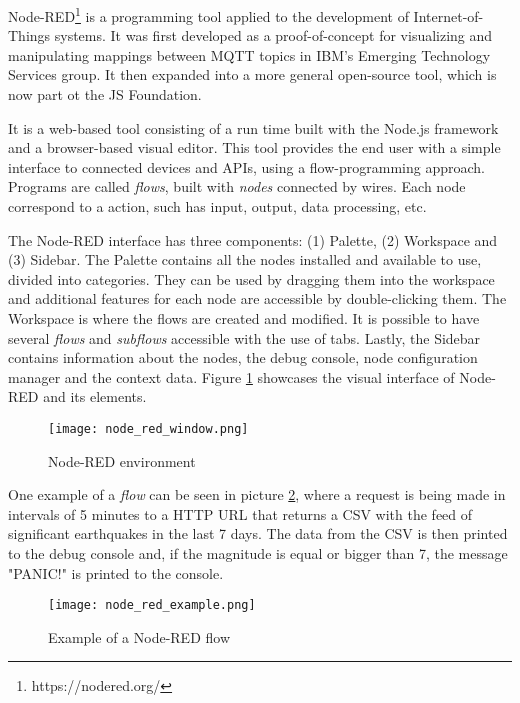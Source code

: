 Node-RED\footnote{https://nodered.org/} is a programming tool applied to the development of Internet-of-Things systems. It was first developed as a proof-of-concept for visualizing and manipulating mappings between MQTT topics in IBM's Emerging Technology Services group. It then expanded into a more general open-source tool, which is now part ot the JS Foundation.
\par It is a web-based tool consisting of a run time built with the Node.js framework and a browser-based visual editor. This tool provides the end user with a simple interface to connected devices and APIs, using a flow-programming approach. Programs are called \emph{flows}, built with \emph{nodes} connected by wires. Each node correspond to a action, such has input, output, data processing, etc. 
\par The Node-RED interface has three components: (1) Palette, (2) Workspace and (3) Sidebar. The Palette contains all the nodes installed and available to use, divided into categories. They can be used by dragging them into the workspace and additional features for each node are accessible by double-clicking them. The Workspace is where the flows are created and modified. It is possible to have several \emph{flows} and \emph{subflows} accessible with the use of tabs. Lastly, the Sidebar contains information about the nodes, the debug console, node configuration manager and the context data. Figure \ref{fig:node_red_window} showcases the visual interface of Node-RED and its elements.

\begin{figure}[h]
\caption{Node-RED environment}
\label{fig:node_red_window}
\centering
\texttt{[image: node\_red\_window.png]}
\end{figure}

\par One example of a \emph{flow} can be seen in picture \ref{fig:node_red_example}, where a request is being made in intervals of 5 minutes to a HTTP URL that returns a CSV with the feed of significant earthquakes in the last 7 days. The data from the CSV is then printed to the debug console and, if the magnitude is equal or bigger than 7, the message "PANIC!" is printed to the console. 

\begin{figure}[!ht]
\caption{Example of a Node-RED flow}
\label{fig:node_red_example}
\centering
\texttt{[image: node\_red\_example.png]}
\end{figure}

